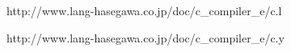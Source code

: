 \label{grammer_e000}
{http://www.lang-hasegawa.co.jp/doc/c_compiler_e/c.l}

{http://www.lang-hasegawa.co.jp/doc/c_compiler_e/c.y}
 